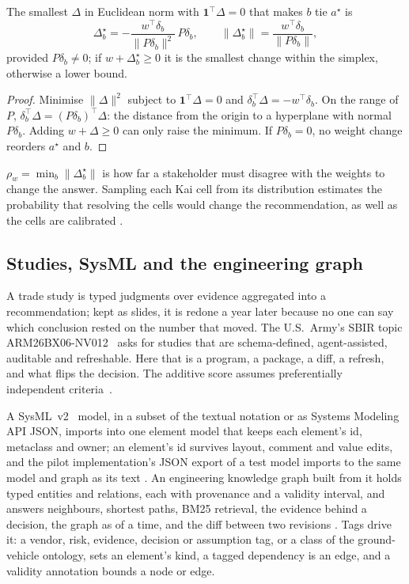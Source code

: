 \begin{proposition}
\label{prop:weights}
The smallest $\Delta$ in Euclidean norm with $\mathbf{1}^{\top}\Delta = 0$ that
makes $b$ tie $a^\star$ is
\begin{equation}
  \Delta^\star_b = -\frac{w^{\top}\delta_b}{\lVert P\delta_b\rVert^2}\,P\delta_b,
  \qquad
  \lVert \Delta^\star_b \rVert = \frac{w^{\top}\delta_b}{\lVert P\delta_b\rVert},
\end{equation}
provided $P\delta_b \ne 0$; if $w + \Delta^\star_b \ge 0$ it is the smallest
change within the simplex, otherwise a lower bound.
\end{proposition}
\begin{proof}
Minimise $\lVert\Delta\rVert^2$ subject to $\mathbf{1}^{\top}\Delta = 0$ and
$\delta_b^{\top}\Delta = -w^{\top}\delta_b$. On the range of $P$,
$\delta_b^{\top}\Delta = (P\delta_b)^{\top}\Delta$: the distance from the origin
to a hyperplane with normal $P\delta_b$. Adding $w + \Delta \ge 0$ can only raise
the minimum. If $P\delta_b = 0$, no weight change reorders $a^\star$ and $b$.
\end{proof}

$\rho_w = \min_b \lVert\Delta^\star_b\rVert$ is how far a stakeholder must
disagree with the weights to change the answer. Sampling each Kai cell from its
distribution estimates the probability that resolving the cells would change
the recommendation, as well as the cells are calibrated \proposed.

\subsection{Studies, SysML and the engineering graph}
\label{sec:studies}

A trade study is typed judgments over evidence aggregated into a
recommendation; kept as slides, it is redone a year later because no one can
say which conclusion rested on the number that moved. The U.S.\ Army's SBIR
topic ARM26BX06-NV012~\cite{armysbir} asks for studies that are
schema-defined, agent-assisted, auditable and refreshable. Here that is a
program, a package, a diff, a refresh, and what flips the decision. The
additive score assumes preferentially independent criteria~\cite{keeney1976}.

A SysML~v2~\cite{sysmlv2} model, in a subset of the textual notation or as
Systems Modeling API JSON, imports into one element model that keeps each
element's id, metaclass and owner; an element's id survives layout, comment and
value edits, and the pilot implementation's JSON export of a test model imports
to the same model and graph as its text \shipped. An engineering knowledge
graph built from it holds typed entities and relations, each with provenance
and a validity interval, and answers neighbours, shortest paths, BM25
retrieval, the evidence behind a decision, the graph as of a time, and the diff
between two revisions \shipped. Tags drive it: a vendor, risk, evidence,
decision or assumption tag, or a class of the ground-vehicle ontology, sets an
element's kind, a tagged dependency is an edge, and a validity annotation
bounds a node or edge.

